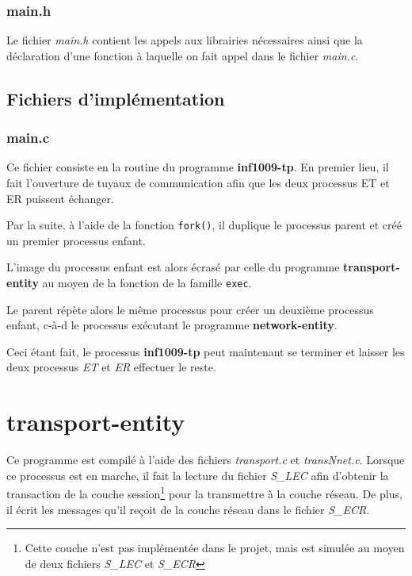 \documentclass[11pt,french]{article}
\begin{document}
            \subsubsection{main.h} %
            \label{ssub:main.h}
                Le fichier \emph{main.h} contient les appels aux librairies nécessaires ainsi que la déclaration
                d'une fonction à laquelle on fait appel dans le fichier \emph{main.c}.
                
        \subsection{Fichiers d'implémentation} %
        \label{sub:fich-compiles-inf1009-tp}
        
        \subsubsection{main.c} %
        \label{ssub:main.c}
            Ce fichier consiste en la routine du programme {\bf inf1009-tp}. En premier lieu, il fait l'ouverture de tuyaux de communication
            afin que les deux processus ET et ER puissent échanger.
            

            Par la suite, à l'aide de la fonction \texttt{fork()}, il duplique le processus parent et créé un premier processus enfant.
            

            L'image du processus enfant est alors écrasé par celle du programme {\bf transport-entity} au moyen de la fonction de la famille
            \texttt{exec}.
            
            
            Le parent répète alors le même processus pour créer un deuxième processus enfant, c-à-d le processus exécutant le programme
            {\bf network-entity}.
            

            Ceci étant fait, le processus {\bf inf1009-tp} peut maintenant se terminer et laisser les deux processus \emph{ET} et \emph{ER} effectuer le reste.

    \section{transport-entity} %
    \label{sec:transport-entity}
        Ce programme est compilé à l'aide des fichiers \emph{transport.c} et \emph{transNnet.c}. Lorsque ce processus est en marche, il fait la lecture
        du fichier \emph{S\_LEC} afin d'obtenir la transaction de la couche session\footnote{Cette couche n'est pas implémentée dans le projet, mais est
        simulée au moyen de deux fichiers \emph{S\_LEC} et \emph{S\_ECR}} pour la transmettre à la couche réseau. De plus,
	il écrit les messages qu'il reçoit de la couche réseau dans le fichier \emph{S\_ECR}.
	
\end{document}
